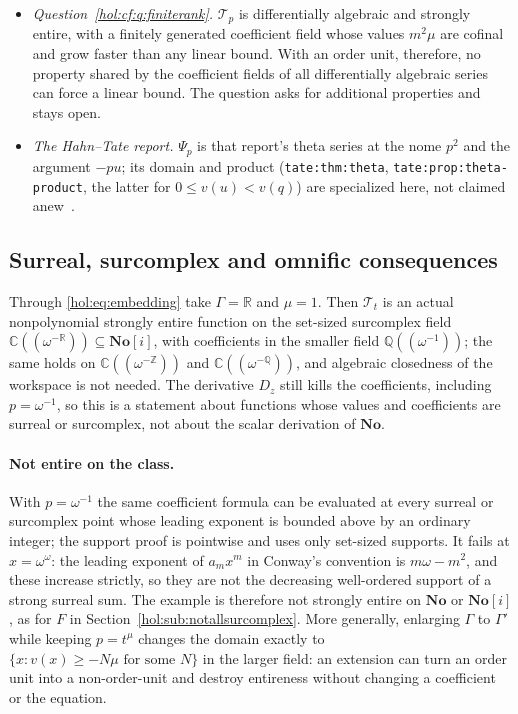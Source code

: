\documentclass[11pt]{article}
\numberwithin{equation}{section}
\theoremstyle{definition}
\theoremstyle{remark}
\newcommand{\C}{\mathbb C}
\newcommand{\R}{\mathbb R}
\newcommand{\Q}{\mathbb Q}
\newcommand{\Z}{\mathbb Z}
\newcommand{\No}{\mathbf{No}}
\begin{document}
\begin{itemize}
says nothing about linear mixed equations, so the question stayed open after
source~13; source~18 has since answered it positively
(Corollary~\ref{hol:ud:cor:unitrigidity}), and the nonlinear analogue is
settled by Corollary~\ref{hol:td:cor:sharp}.
\item \emph{Question~\ref{hol:cf:q:finiterank}.} $\mathcal T_p$ is
differentially algebraic and strongly entire, with a finitely generated
coefficient field whose values $m^2\mu$ are cofinal and grow faster than any
linear bound. With an order unit, therefore, no property shared by the
coefficient fields of all differentially algebraic series can force a linear
bound. The question asks for additional properties and stays open.
\item \emph{The Hahn--Tate report.} $\Psi_p$ is that report's theta series at
the nome $p^2$ and the argument $-pu$; its domain and product
(\texttt{tate:thm:theta}, \texttt{tate:prop:theta-product}, the latter for
$0\le v(u)<v(q)$) are specialized here, not claimed anew~\cite{repotate}.
\end{itemize}

\subsection{Surreal, surcomplex and omnific consequences}
\label{hol:td:sub:surreal}

Through \eqref{hol:eq:embedding} take $\Gamma=\R$ and $\mu=1$. Then
$\mathcal T_t$ is an actual nonpolynomial strongly entire function on the
set-sized surcomplex field $\C((\omega^{-\R}))\subseteq\No[i]$, with
coefficients in the smaller field $\Q((\omega^{-1}))$; the same holds on
$\C((\omega^{-\Z}))$ and $\C((\omega^{-\Q}))$, and algebraic closedness of the
workspace is not needed. The derivative $D_z$ still kills the coefficients,
including $p=\omega^{-1}$, so this is a statement about functions whose values
and coefficients are surreal or surcomplex, not about the scalar derivation of
$\No$.

\paragraph{Not entire on the class.}
With $p=\omega^{-1}$ the same coefficient formula can be evaluated at every
surreal or surcomplex point whose leading exponent is bounded above by an
ordinary integer; the support proof is pointwise and uses only set-sized
supports. It fails at $x=\omega^\omega$: the leading exponent of $a_mx^m$ in
Conway's convention is $m\omega-m^2$, and these increase strictly, so they are
not the decreasing well-ordered support of a strong surreal sum. The example
is therefore not strongly entire on $\No$ or $\No[i]$, as for $F$ in
Section~\ref{hol:sub:notallsurcomplex}. More generally, enlarging $\Gamma$ to
$\Gamma'$ while keeping $p=t^\mu$ changes the domain exactly to
$\{x:v(x)\ge-N\mu\text{ for some }N\}$ in the larger field: an extension can
turn an order unit into a non-order-unit and destroy entireness without
changing a coefficient or the equation.
\end{document}
